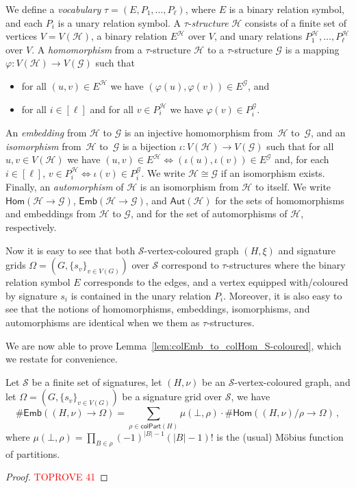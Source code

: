 \documentclass[authorcolumns,numberwithinsect]{no-lipics-v2022}
\newcommand{\homs}[2]{\mathsf{Hom}(#1 \to #2)}
\newcommand{\embs}[2]{\mathsf{Emb}(#1 \to #2)}
\newcommand{\auts}{\mathsf{Aut}}
\begin{document}
We define a \emph{vocabulary} $\tau=(E,P_1,\dots,P_\ell)$, where $E$ is a binary relation symbol, and each $P_i$ is a unary relation symbol. A $\tau$-\emph{structure} $\mathcal{H}$ consists of a finite set of vertices $V=V(\mathcal{H})$, a binary relation $E^\mathcal{H}$ over $V$, and unary relations $P_1^\mathcal{H},\dots,P_\ell^{\mathcal{H}}$ over $V$.
A \emph{homomorphism} from a $\tau$-structure $\mathcal{H}$ to a $\tau$-structure $\mathcal{G}$ is a mapping $\varphi: V(\mathcal{H}) \to V(\mathcal{G})$ such that
\begin{itemize}
    \item for all $(u,v)\in E^\mathcal{H}$ we have $(\varphi(u),\varphi(v))\in E^\mathcal{G}$, and
    \item for all $i\in[\ell]$ and for all $v\in P_i^\mathcal{H}$ we have $\varphi(v)\in P_i^\mathcal{G}$.
\end{itemize}

An \emph{embedding} from $\mathcal{H}$ to $\mathcal{G}$ is an injective homomorphism from~$\mathcal{H}$ to~$\mathcal{G}$, and an \emph{isomorphism} from~$\mathcal{H}$ to~$\mathcal{G}$ is a bijection $\iota:V(\mathcal{H})\to V(\mathcal{G})$ such that for all $u,v\in V(\mathcal{H})$ we have $(u,v)\in E^\mathcal{H} \Leftrightarrow (\iota(u),\iota(v))\in E^\mathcal{G}$ and, for each $i\in[\ell]$, $v\in P_i^\mathcal{H}\Leftrightarrow \iota(v)\in P_i^\mathcal{G}$. We write $\mathcal{H}\cong\mathcal{G}$ if an isomorphism exists. Finally, an \emph{automorphism} of $\mathcal{H}$ is an isomorphism from $\mathcal{H}$ to itself. We write $\homs{\mathcal{H}}{\mathcal{G}}$, $\embs{\mathcal{H}}{\mathcal{G}}$, and $\auts(\mathcal{H})$ for the sets of homomorphisms and embeddings from $\mathcal{H}$ to $\mathcal{G}$, and for the set of automorphisms of $\mathcal{H}$, respectively.

Now it is easy to see that both $\mathcal{S}$-vertex-coloured graph $(H,\xi)$ and signature grids $\Omega=(G,\{s_v\}_{v\in V(G)})$ over $\mathcal{S}$ correspond to $\tau$-structures where the binary relation symbol $E$ corresponds to the edges, and a vertex equipped with/coloured by signature $s_i$ is contained in the unary relation $P_i$. Moreover, it is also easy to see that the notions of homomorphisms, embeddings, isomorphisms, and automorphisms are identical when we them as $\tau$-structures.

We are now able to prove Lemma~\ref{lem:colEmb_to_colHom_S-coloured}, which we restate for convenience.
\begin{lemma}
      Let $\mathcal{S}$ be a finite set of signatures, let $(H,\nu)$ be an $\mathcal{S}$-vertex-coloured graph, and let $\Omega=(G,\{s_v\}_{v\in V(G)})$ be a signature grid over $\mathcal{S}$, we have
    \[ \#\embs{(H,\nu)}{\Omega} = \sum_{\rho \in \mathsf{colPart}(H)} \mu(\bot,\rho)\cdot \#\homs{(H,\nu)/\rho}{\Omega}\,,\]
    where $\mu(\bot,\rho)=\prod_{B\in \rho}(-1)^{|B|-1}(|B|-1)!$ is the (usual) M\"obius function of partitions.
\end{lemma}
\begin{proof}\textcolor{red}{TOPROVE 41}\end{proof}
\end{document}
